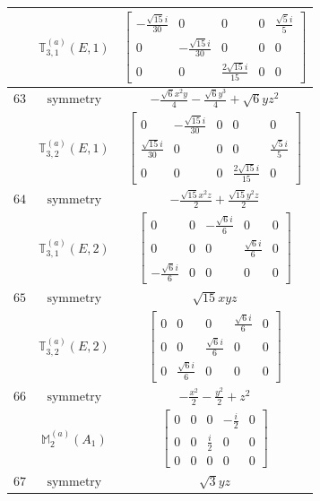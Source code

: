 \documentclass[fleqn,8pt,landscape]{jsarticle}
\begin{document}
\begin{longtable}{ccc}
$  $ & $ \mathbb{T}_{3,1}^{(a)}(E,1) $ & $ \begin{bmatrix} - \frac{\sqrt{15} i}{30} & 0 & 0 & 0 & \frac{\sqrt{5} i}{5} \\ 0 & - \frac{\sqrt{15} i}{30} & 0 & 0 & 0 \\ 0 & 0 & \frac{2 \sqrt{15} i}{15} & 0 & 0 \end{bmatrix} $ \\ \hline
$ 63 $ & $ \text{symmetry} $ & $ - \frac{\sqrt{6} x^{2} y}{4} - \frac{\sqrt{6} y^{3}}{4} + \sqrt{6} y z^{2} $ \\
$  $ & $ \mathbb{T}_{3,2}^{(a)}(E,1) $ & $ \begin{bmatrix} 0 & - \frac{\sqrt{15} i}{30} & 0 & 0 & 0 \\ \frac{\sqrt{15} i}{30} & 0 & 0 & 0 & \frac{\sqrt{5} i}{5} \\ 0 & 0 & 0 & \frac{2 \sqrt{15} i}{15} & 0 \end{bmatrix} $ \\ \hline
$ 64 $ & $ \text{symmetry} $ & $ - \frac{\sqrt{15} x^{2} z}{2} + \frac{\sqrt{15} y^{2} z}{2} $ \\
$  $ & $ \mathbb{T}_{3,1}^{(a)}(E,2) $ & $ \begin{bmatrix} 0 & 0 & - \frac{\sqrt{6} i}{6} & 0 & 0 \\ 0 & 0 & 0 & \frac{\sqrt{6} i}{6} & 0 \\ - \frac{\sqrt{6} i}{6} & 0 & 0 & 0 & 0 \end{bmatrix} $ \\ \hline
$ 65 $ & $ \text{symmetry} $ & $ \sqrt{15} x y z $ \\
$  $ & $ \mathbb{T}_{3,2}^{(a)}(E,2) $ & $ \begin{bmatrix} 0 & 0 & 0 & \frac{\sqrt{6} i}{6} & 0 \\ 0 & 0 & \frac{\sqrt{6} i}{6} & 0 & 0 \\ 0 & \frac{\sqrt{6} i}{6} & 0 & 0 & 0 \end{bmatrix} $ \\ \hline
$ 66 $ & $ \text{symmetry} $ & $ - \frac{x^{2}}{2} - \frac{y^{2}}{2} + z^{2} $ \\
$  $ & $ \mathbb{M}_{2}^{(a)}(A_{1}) $ & $ \begin{bmatrix} 0 & 0 & 0 & - \frac{i}{2} & 0 \\ 0 & 0 & \frac{i}{2} & 0 & 0 \\ 0 & 0 & 0 & 0 & 0 \end{bmatrix} $ \\ \hline
$ 67 $ & $ \text{symmetry} $ & $ \sqrt{3} y z $ \\

\end{longtable}
\end{document}
